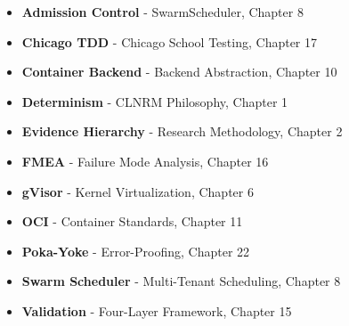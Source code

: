\documentclass[12pt,twoside,openright]{book}
\theoremstyle{plain}
\theoremstyle{definition}
\theoremstyle{remark}
\begin{document}
\begin{itemize}
  \item \textbf{Admission Control} - SwarmScheduler, Chapter 8
  \item \textbf{Chicago TDD} - Chicago School Testing, Chapter 17
  \item \textbf{Container Backend} - Backend Abstraction, Chapter 10
  \item \textbf{Determinism} - CLNRM Philosophy, Chapter 1
  \item \textbf{Evidence Hierarchy} - Research Methodology, Chapter 2
  \item \textbf{FMEA} - Failure Mode Analysis, Chapter 16
  \item \textbf{gVisor} - Kernel Virtualization, Chapter 6
  \item \textbf{OCI} - Container Standards, Chapter 11
  \item \textbf{Poka-Yoke} - Error-Proofing, Chapter 22
  \item \textbf{Swarm Scheduler} - Multi-Tenant Scheduling, Chapter 8
  \item \textbf{Validation} - Four-Layer Framework, Chapter 15
\end{itemize}
\end{document}
